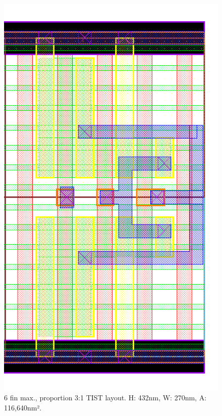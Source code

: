 \documentclass[pgmicro,diss,english]{iiufrgs}
\begin{document}
\begin{figure}[]
\centering
\includegraphics[width=\textwidth,height=\textheight,keepaspectratio]{TIST6F2F.png}
\caption{6 fin max., proportion 3:1 TIST layout. H: 432nm, W: 270nm, A: 116,640nm².}
\label{fig:TIST4F}
\end{figure}
\end{document}
